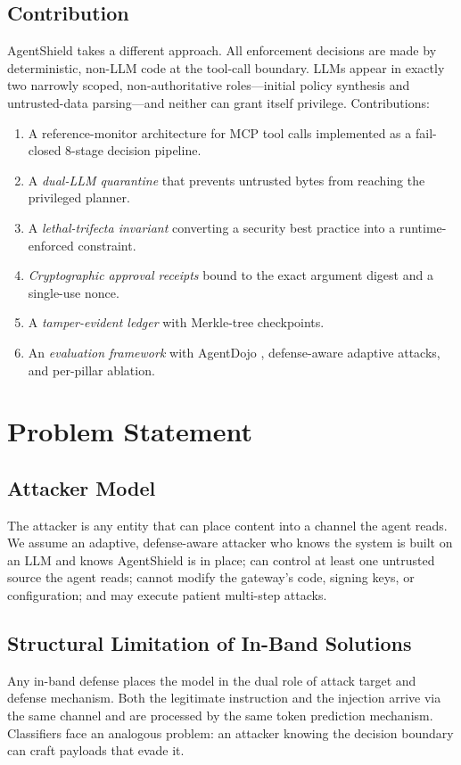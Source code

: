 \documentclass[10pt,conference]{IEEEtran}
\begin{document}
\subsection{Contribution}
AgentShield takes a different approach. All enforcement decisions are made by
deterministic, non-LLM code at the tool-call boundary. LLMs appear in exactly
two narrowly scoped, non-authoritative roles---initial policy synthesis and
untrusted-data parsing---and neither can grant itself privilege. Contributions:

\begin{enumerate}
  \item A reference-monitor architecture for MCP tool
        calls implemented as a fail-closed 8-stage decision pipeline.
  \item A \emph{dual-LLM quarantine} that prevents untrusted bytes from
        reaching the privileged planner.
  \item A \emph{lethal-trifecta invariant} converting a security best
        practice into a runtime-enforced constraint.
  \item \emph{Cryptographic approval receipts} bound to the exact argument
        digest and a single-use nonce.
  \item A \emph{tamper-evident ledger} with Merkle-tree checkpoints.
  \item An \emph{evaluation framework} with AgentDojo \cite{agentdojo2024},
        defense-aware adaptive attacks, and per-pillar ablation.
\end{enumerate}

\section{Problem Statement}

\subsection{Attacker Model}
The attacker is any entity that can place content into a channel the agent
reads. We assume an adaptive, defense-aware attacker who knows the system is
built on an LLM and knows AgentShield is in place; can control at least one
untrusted source the agent reads; cannot modify the gateway's code, signing
keys, or configuration; and may execute patient multi-step attacks.

\subsection{Structural Limitation of In-Band Solutions}
Any in-band defense places the model in the dual role of attack target and
defense mechanism. Both the legitimate instruction and the injection arrive via
the same channel and are processed by the same token prediction mechanism.
Classifiers face an analogous problem: an attacker knowing the decision
boundary can craft payloads that evade it.
\end{document}
